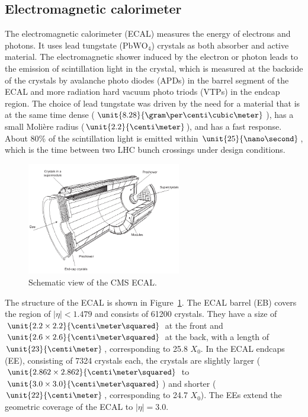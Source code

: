 \subsection{Electromagnetic calorimeter}
The electromagnetic calorimeter (ECAL) measures the energy of electrons and photons. It uses lead tungstate ($\mathrm{PbWO}_4$) crystals as both absorber and active material. The electromagnetic shower induced by the electron or photon leads to the emission of scintillation light in the crystal, which is measured at the backside of the crystals by avalanche photo diodes (APDs) in the barrel segment of the ECAL and more radiation hard vacuum photo triods (VTPs) in the endcap region. The choice of lead tungstate was driven by the need for a material that is at the same time dense ($\unit{8.28}{\gram\per\centi\cubic\meter}$), has a small Moli\`{e}re radius ($\unit{2.2}{\centi\meter}$), and has a fast response. About 80\% of the scintillation light is emitted within $\unit{25}{\nano\second}$, which is the time between two LHC bunch crossings under design conditions. 
\begin{figure}[htbp]
\centering
  \includegraphics[width=0.6\textwidth]{plots/CMS/ECAL.png}
\caption{Schematic view of the CMS ECAL.}
\label{fig:ECAL}
\end{figure} 
The structure of the ECAL is shown in Figure~\ref{fig:ECAL}. The ECAL barrel (EB) covers the region of $\vert \eta \vert < 1.479$ and consists of 61200 crystals. They have a size of $\unit{2.2\times2.2}{\centi\meter\squared}$ at the front and $\unit{2.6\times2.6}{\centi\meter\squared}$ at the back, with a length of $\unit{23}{\centi\meter}$, corresponding to 25.8 $X_0$. In the ECAL endcaps (EE), consisting of 7324 crystals each, the crystals are slightly larger ($\unit{2.862\times2.862}{\centi\meter\squared}$ to $\unit{3.0\times3.0}{\centi\meter\squared}$) and shorter ($\unit{22}{\centi\meter}$, corresponding to 24.7 $X_0$). The EEs extend the geometric coverage of the ECAL to $\vert \eta \vert = 3.0$. 

